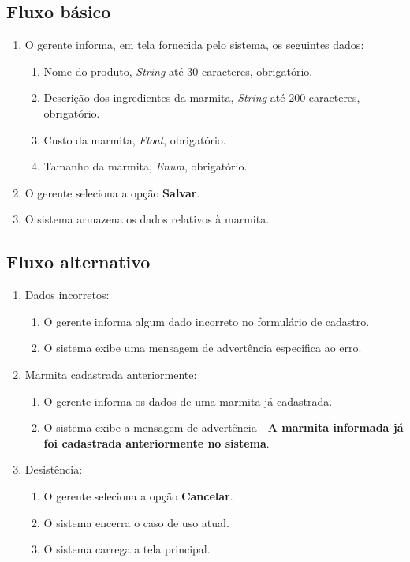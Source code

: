 \subsection{Fluxo básico}

\begin{enumerate}
	\item O gerente informa, em tela fornecida pelo sistema, os seguintes dados:
	\begin{enumerate}
		\item Nome do produto, \emph{String} até 30 caracteres, obrigatório.
		\item Descrição dos ingredientes da marmita, \emph{String} até 200 caracteres, obrigatório.
		\item Custo da marmita, \emph{Float}, obrigatório.
		\item Tamanho da marmita, \emph{Enum}, obrigatório.
	\end{enumerate}
	\item O gerente seleciona a opção \textbf{Salvar}.
	\item O sistema armazena os dados relativos à marmita.
\end{enumerate}

\subsection{Fluxo alternativo}

\begin{enumerate}
	\item Dados incorretos:
	\begin{enumerate}
		\item O gerente informa algum dado incorreto no formulário de cadastro. 
		\item O sistema exibe uma mensagem de advertência especifica ao erro.
	\end{enumerate}	
	\item Marmita cadastrada anteriormente:
	\begin{enumerate}
		\item O gerente informa os dados de uma marmita já cadastrada. 
		\item O sistema exibe a mensagem de advertência - \textbf{A marmita informada já foi cadastrada anteriormente no sistema}.
	\end{enumerate}	
	\item Desistência:
	\begin{enumerate}
		\item O gerente seleciona a opção \textbf{Cancelar}.
		\item O sistema encerra o caso de uso atual.
		\item O sistema carrega a tela principal.
	\end{enumerate}
\end{enumerate}

